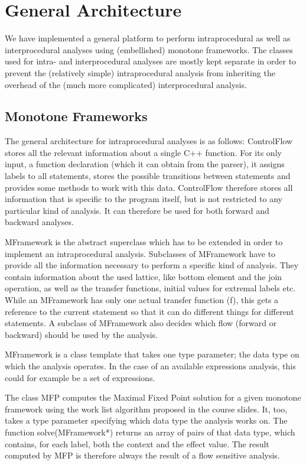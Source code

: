 \documentclass[a4paper,11pt]{article}
\begin{document}
\section{General Architecture}
We have implemented a general platform to perform intraprocedural as well as interprocedural analyses using (embellished) monotone frameworks. The classes used for intra- and interprocedural analyses are mostly kept separate in order to prevent the (relatively simple) intraprocedural analysis from inheriting the overhead of the (much more complicated) interprocedural analysis.

\subsection{Monotone Frameworks}
The general architecture for intraprocedural analyses is as follows:
ControlFlow stores all the relevant information about a single C++ function. For its only input, a function declaration (which it can obtain from the parser), it assigns labels to all statements, stores the possible transitions between statements and provides some methods to work with this data. ControlFlow therefore stores all information that is specific to the program itself, but is not restricted to any particular kind of analysis. It can therefore be used for both forward and backward analyses.

MFramework is the abstract superclass which has to be extended in order to implement an intraprocedural analysis. Subclasses of MFramework have to provide all the information necessary to perform a specific kind of analysis. They contain information about the used lattice, like bottom element and the join operation, as well as the transfer functions, initial values for extremal labels etc. While an MFramework has only one actual transfer function (f), this gets a reference to the current statement so that it can do different things for different statements. A subclass of MFramework also decides which flow (forward or backward) should be used by the analysis.

MFramework is a class template that takes one type parameter; the data type on which the analysis operates. In the case of an available expressions analysis, this could for example be a set of expressions.

The class MFP computes the Maximal Fixed Point solution for a given monotone framework using the work list algorithm proposed in the course slides. It, too, takes a type parameter specifying which data type the analysis works on. The function solve(MFramework*) returns an array of pairs of that data type, which contains, for each label, both the context and the effect value. 
The result computed by MFP is therefore always the result of a flow sensitive analysis.
\end{document}
